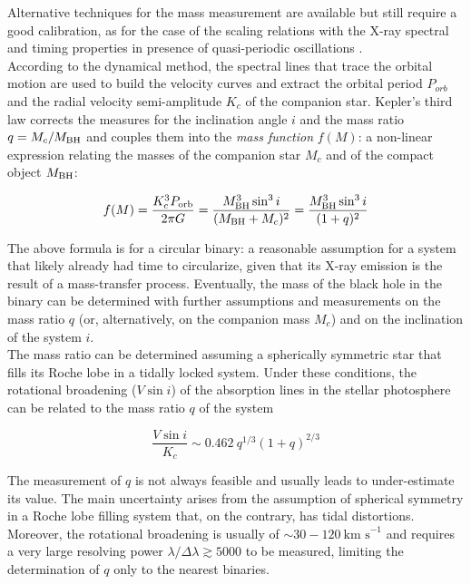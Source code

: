 \documentclass[a4paper,titlepage]{book}     	%
\begin{document}
Alternative techniques for the mass measurement are available but still require a good calibration, as for the case of the scaling relations with the X-ray spectral and timing properties in presence of quasi-periodic oscillations \cite{Xbinaries_massfromXtiming}.\\

According to the dynamical method, the spectral lines that trace the orbital motion are used to build the velocity curves and extract the orbital period $P_{orb}$ and the radial velocity semi-amplitude $K_c$ of the companion star. Kepler's third law corrects the measures for the inclination angle $i$ and the mass ratio $q=M_c/M_{\rm BH}$ and couples them into the \emph{mass function} $f(M)$: a non-linear expression relating the masses of the companion star $M_c$ and of the compact object $M_{\rm BH}$:

\begin{equation}\label{eq:massfunction}
	f(M) = \frac{K_c^3 P_{\rm orb}}{2 \pi G} = \frac{M_{\rm BH}^3 \sin^3 i}{(M_{\rm BH} + M_c)^2} = \frac{M_{\rm BH}^3 \sin^3 i}{(1+q)^2}
\end{equation}

The above formula is for a circular binary: a reasonable assumption for a system that likely already had time to circularize, given that its X-ray emission is the result of a mass-transfer process. Eventually, the mass of the black hole in the binary can be determined with further assumptions and measurements on the mass ratio $q$ (or, alternatively, on the companion mass $M_c$) and on the inclination of the system $i$.\\

The mass ratio can be determined assuming a spherically symmetric star that fills its Roche lobe in a tidally locked system. Under these conditions, the rotational broadening ($V \sin i$) of the absorption lines in the stellar photosphere can be related to the mass ratio $q$ of the system \cite{Xbinaries_qmeasure}

\begin{equation}\label{eq:qmeasure}
	\frac{V \sin i}{K_c} \sim 0.462~q^{1/3} (1+q)^{2/3} 
\end{equation}

The measurement of $q$ is not always feasible and usually leads to under-estimate its value. The main uncertainty arises from the assumption of spherical symmetry in a Roche lobe filling system that, on the contrary, has tidal distortions. Moreover, the rotational broadening is usually of $\sim 30-120~\text{km s}^{-1}$ and requires a very large resolving power $\lambda/\Delta \lambda \gtrsim 5000$ to be measured, limiting the determination of $q$ only to the nearest binaries. 
\end{document}

